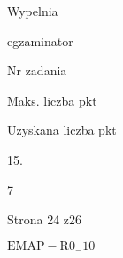 \documentclass[a4paper,12pt]{article}
\begin{document}
Wypelnia

egzaminator

Nr zadania

Maks. liczba pkt

Uzyskana liczba pkt

15.

7

Strona 24 z26

$\mathrm{E}\mathrm{M}\mathrm{A}\mathrm{P}-\mathrm{R}0_{-}10$
\end{document}
